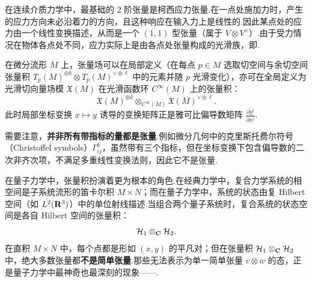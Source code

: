 \begin{example}\label{ex:stress-tensor}
在连续介质力学中，最基础的 $2$ 阶张量是柯西应力张量.在一点处施加力时，产生的应力方向未必沿着力的方向，且这种响应在输入力上是线性的.因此某点处的应力由一个线性变换描述，从而是一个 $(1, 1)$ 型张量（属于 $V \otimes V^\vee$）.由于受力情况在物体各点处不同，应力实际上是由各点处张量构成的光滑族，即.

在微分流形 $M$ 上，张量场可以在局部定义（在每点 $p \in M$ 选取切空间与余切空间张量积 $T_p(M)^{\otimes k} \otimes T_p(M)^{\vee \otimes \ell}$ 中的元素并随 $p$ 光滑变化），亦可在全局定义为光滑切向量场模 $\mathfrak{X}(M)$ 在光滑函数环 $C^\infty(M)$ 上的张量积：
\[
  \mathfrak{X}(M)^{\otimes k} \otimes_{C^\infty(M)} \mathfrak{X}(M)^{\vee \otimes \ell}.
\]
此时局部坐标变换 $x \mapsto y$ 诱导的变换矩阵正是雅可比偏导数矩阵 $\frac{\partial y^i}{\partial x^j}$.
\end{example}

需要注意，\textbf{并非所有带指标的量都是张量}.例如微分几何中的克里斯托费尔符号（Christoffel symbols）$\Gamma^k_{ij}$，虽然带有三个指标，但在坐标变换下包含偏导数的二次非齐次项，不满足多重线性变换法则，因此它不是张量.

在量子力学中，张量积扮演着更为根本的角色.在经典力学中，复合力学系统的相空间是子系统流形的笛卡尔积 $M \times N$；而在量子力学中，系统的状态由复 Hilbert 空间（如 $L^2(\mathbf{R}^3)$）中的单位射线描述.当组合两个量子系统时，复合系统的状态空间是各自 Hilbert 空间的张量积：
\[
  \mathcal{H}_1 \otimes_{\mathbf{C}} \mathcal{H}_2.
\]
在直积 $M \times N$ 中，每个点都是形如 $(x, y)$ 的平凡对；但在张量积 $\mathcal{H}_1 \otimes_{\mathbf{C}} \mathcal{H}_2$ 中，绝大多数张量都\textbf{不是简单张量}.那些无法表示为单一简单张量 $v \otimes w$ 的态，正是量子力学中最神奇也最深刻的现象——.
